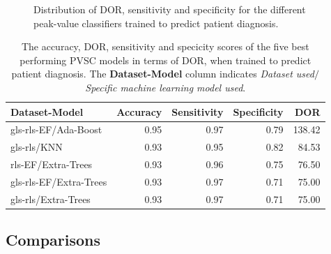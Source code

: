 \begin{figure}[htb]
    \centering
    
    \caption{Distribution of DOR, sensitivity and specificity for the different peak-value classifiers trained to predict patient diagnosis.}
    \label{fig:pvmlc_ind_dor_sens_spec_dist}
\end{figure}

\begin{table}
    \centering
    \begin{tabular}{lrrrr}
        \toprule
        Dataset-Model              &  Accuracy &  Sensitivity &  Specificity &  DOR \\
        \midrule
        gls-rls-EF/Ada-Boost   &      0.95 &         0.97 &         0.79 & 138.42 \\
        gls-rls/KNN            &      0.93 &         0.95 &         0.82 &  84.53 \\
        rls-EF/Extra-Trees     &      0.93 &         0.96 &         0.75 &  76.50 \\
        gls-rls-EF/Extra-Trees &      0.93 &         0.97 &         0.71 &  75.00 \\
        gls-rls/Extra-Trees    &      0.93 &         0.97 &         0.71 &  75.00 \\
        \bottomrule
    \end{tabular}
    \caption{The accuracy, DOR, sensitivity and specicity scores of the five best performing PVSC models in terms of DOR, when trained to predict patient diagnosis.
             The \textbf{Dataset-Model} column indicates \textit{Dataset used}$/$\textit{Specific machine learning model used}.}
    \label{tab:dl_hf_dor_sens_spec_dist}
\end{table}

\newpage

\subsection{Comparisons}

\newpage

